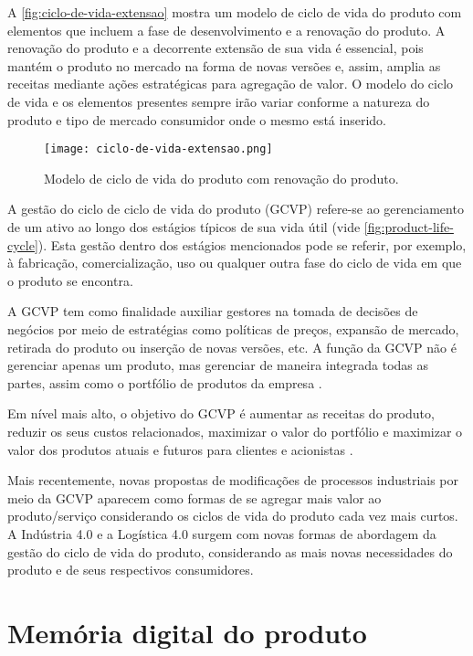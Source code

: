 	A \autoref{fig:ciclo-de-vida-extensao} mostra um modelo de ciclo de vida do produto com elementos que incluem a fase de desenvolvimento e a renovação do produto. A renovação do produto e a decorrente extensão de sua vida é essencial, pois mantém o produto no mercado na forma de novas versões e, assim, amplia as receitas mediante ações estratégicas para agregação de valor. O modelo do ciclo de vida e os elementos presentes sempre irão variar conforme a natureza do produto e tipo de mercado consumidor onde o mesmo está inserido.
	
	\begin{figure}[htb]
		\centering
		\label{fig:ciclo-de-vida-extensao}
		\texttt{[image: ciclo-de-vida-extensao.png]}
		\caption{Modelo de ciclo de vida do produto com renovação do produto.}
	\end{figure}
	
	A gestão do ciclo de ciclo de vida do produto (GCVP) refere-se ao gerenciamento de um ativo ao longo dos estágios típicos de sua vida útil (vide \autoref{fig:product-life-cycle}). Esta gestão dentro dos estágios mencionados pode se referir, por exemplo, à fabricação, comercialização, uso ou qualquer outra fase do ciclo de vida em que o produto se encontra. 
	
	A GCVP tem como finalidade auxiliar gestores na tomada de decisões de negócios por meio de estratégias como políticas de preços, expansão de mercado, retirada do produto ou inserção de novas versões, etc. A função da GCVP não é gerenciar apenas um produto, mas gerenciar de maneira integrada todas as partes, assim como o portfólio de produtos da empresa \cite{stark2015lifecycle}.
	
	Em nível mais alto, o objetivo do GCVP é aumentar as receitas do produto, reduzir os seus custos relacionados, maximizar o valor do portfólio e maximizar o valor dos produtos atuais e futuros para clientes e acionistas \cite{stark2015lifecycle}.
	
	Mais recentemente, novas propostas de modificações de processos industriais por meio da GCVP aparecem como formas de se agregar mais valor ao produto/serviço considerando os ciclos de vida do produto cada vez mais curtos. A Indústria 4.0 e a Logística 4.0 surgem com novas formas de abordagem da gestão do ciclo de vida do produto, considerando as mais novas necessidades do produto e de seus respectivos consumidores.

\section{Memória digital do produto}

